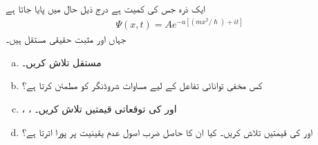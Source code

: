 ایک ذرہ جس کی کمیت  ہے درج ذیل حال میں پایا جاتا ہے 
\begin{align*}
\Psi (x,t)=Ae^{-a[(mx^{2}/\hslash)+it]}
\end{align*}
جہاں  اور  مثبت حقیقی مستقل ہیں۔
\begin{enumerate}[a.]
\item
مستقل  تلاش کریں۔
\item
کس مخفی توانائی تفاعل  کے لیے  مساوات شروڈنگر کو مطمئن کرتا ہے؟
\item
{}، ،  اور  کی توقعاتی قیمتیں تلاش کریں۔
\item
{} اور  کی قیمتیں تلاش کریں۔ کیا ان کا حاصل ضرب اصول عدم یقینیت پر پورا اترتا ہے؟
\end{enumerate}

